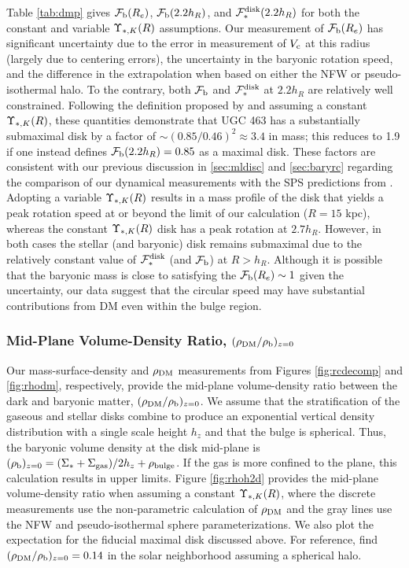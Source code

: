 \documentclass[apj,iop,numberedappendix]{emulateapj}
\begin{document}
Table \ref{tab:dmp} gives $\mathcal{F}_{\rm b}(R_e)$, $\mathcal{F}_{\rm b}(2.2h_R)$, and $\mathcal{F}_{\ast}^{\rm disk}(2.2h_R)$
for both the constant and variable $\Upsilon_{\ast,K}(R)$ assumptions.  Our measurement of
$\mathcal{F}_{\rm b}(R_e)$ has significant uncertainty due to the error in measurement of
$V_{\rm c}$ at this radius (largely due to centering errors), the uncertainty in the
baryonic rotation speed, and the difference in the extrapolation when based on
either the NFW or pseudo-isothermal halo.  To the contrary, both $\mathcal{F}_{\rm b}$ and
$\mathcal{F}_{\ast}^{\rm disk}$ at $2.2h_R$ are relatively well constrained.  Following the definition
proposed by \citet{1997ApJ...483..103S} and assuming a constant $\Upsilon_{\ast,K}(R)$,
these quantities demonstrate that UGC 463 has a substantially submaximal disk
by a factor of $\sim(0.85/0.46)^2\approx3.4$ in mass; this reduces to 1.9 if one
instead defines $\mathcal{F}_{\rm b} (2.2h_R) = 0.85$ as a maximal disk.  These factors are
consistent with our previous discussion in \sects \ref{sec:mldisc} and
\ref{sec:baryrc} regarding the comparison of our dynamical measurements with the
SPS predictions from .  Adopting a variable
$\Upsilon_{\ast,K}(R)$ results in a mass profile of the disk that yields a peak rotation
speed at or beyond the limit of our calculation ($R=15$ kpc), whereas the
constant $\Upsilon_{\ast,K}(R)$ disk has a peak rotation at $2.7 h_R$.  However, in both
cases the stellar (and baryonic) disk remains submaximal due to the relatively
constant value of $\mathcal{F}_{\ast}^{\rm disk}$ (and $\mathcal{F}_{\rm b}$) at $R>h_R$.  Although it is possible
that the baryonic mass is close to satisfying the $\mathcal{F}_{\rm b}(R_e)\sim 1$ given the
uncertainty, our data suggest that the circular speed may have substantial
contributions from DM even within the bulge region.

\subsubsection{Mid-Plane Volume-Density Ratio, $(\rho_{\rm DM}/\rho_{\rm b})_{z=0}$}
\label{sec:rhorat}

Our mass-surface-density and $\rho_{\rm DM}$ measurements from Figures
\ref{fig:rcdecomp} and \ref{fig:rhodm}, respectively, provide the mid-plane
volume-density ratio between the dark and baryonic matter,
$(\rho_{\rm DM}/\rho_{\rm b})_{z=0}$.  We assume that the stratification of the gaseous and
stellar disks combine to produce an exponential vertical density distribution
with a single scale height $h_z$ and that the bulge is spherical.  Thus, the
baryonic volume density at the disk mid-plane is $(\rho_{\rm b})_{z=0} =
(\Sigma_{\rm \ast}+\Sigma_{\rm gas})/2h_z + \rho_{\rm bulge}$.  If the gas is more confined to the plane, this
calculation results in upper limits.  Figure \ref{fig:rhoh2d} provides the
mid-plane volume-density ratio when assuming a constant $\Upsilon_{\ast,K}(R)$, where the
discrete measurements use the non-parametric calculation of $\rho_{\rm DM}$ and the
gray lines use the NFW and pseudo-isothermal sphere parameterizations.  We also
plot the expectation for the fiducial maximal disk discussed above.  For
reference, \citet{2006A&A...446..933B} find $(\rho_{\rm DM}/\rho_{\rm b})_{z=0} = 0.14$ in
the solar neighborhood assuming a spherical halo.
\end{document}
